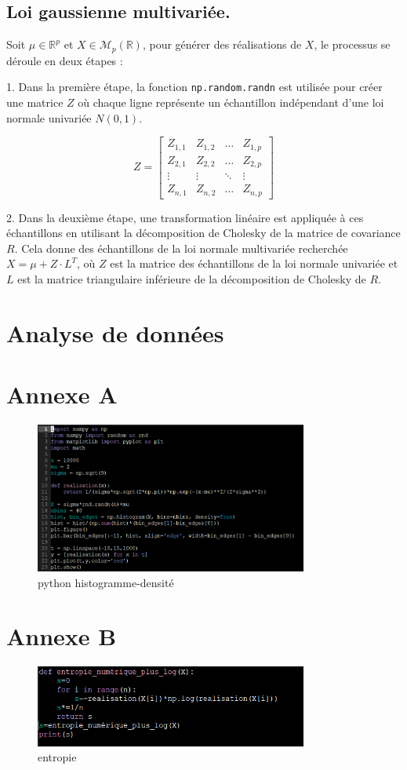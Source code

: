 \documentclass[a4paper]{article}
\begin{document}
\newpage

\subsection{Loi gaussienne multivariée.}
Soit \(\mu \in \mathbb{R}^p\) et \(X \in \mathcal{M}_p(\mathbb{R})\), pour générer des réalisations de \(X\), le processus se déroule en deux étapes :

1. Dans la première étape, la fonction \texttt{np.random.randn} est utilisée pour créer une matrice \(Z\) où chaque ligne représente un échantillon indépendant d'une loi normale univariée \(N(0,1)\).

\[
Z = \begin{bmatrix}
    Z_{1,1} & Z_{1,2} & \ldots & Z_{1,p} \\
    Z_{2,1} & Z_{2,2} & \ldots & Z_{2,p} \\
    \vdots  & \vdots  & \ddots & \vdots  \\
    Z_{n,1} & Z_{n,2} & \ldots & Z_{n,p}
\end{bmatrix}
\]

2. Dans la deuxième étape, une transformation linéaire est appliquée à ces échantillons en utilisant la décomposition de Cholesky de la matrice de covariance \(R\). Cela donne des échantillons de la loi normale multivariée recherchée \(X = \mu + Z \cdot L^T\), où \(Z\) est la matrice des échantillons de la loi normale univariée et \(L\) est la matrice triangulaire inférieure de la décomposition de Cholesky de \(R\).
\section{Analyse de données}

\appendix
\section{Annexe A}
\begin{figure}[h]
  \centering
  \includegraphics[width=0.8\textwidth]{1.png}
  \caption{python histogramme-densité}
\end{figure}

\section{Annexe B}
\begin{figure}[h]
  \centering
  \includegraphics[width=0.8\textwidth]{4.png}
  \caption{entropie}
\end{figure}
\end{document}
